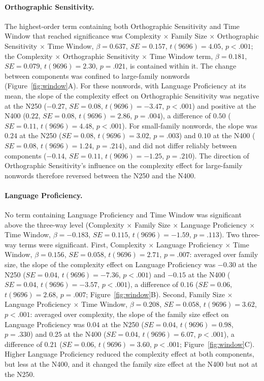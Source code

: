 \paragraph*{Orthographic Sensitivity.} The highest-order term containing both Orthographic Sensitivity and Time Window that reached significance was Complexity $\times$ Family Size $\times$ Orthographic Sensitivity $\times$ Time Window, $\beta = 0.637$, $SE = 0.157$, $t(9696) = 4.05$, $p < .001$; the Complexity $\times$ Orthographic Sensitivity $\times$ Time Window term, $\beta = 0.181$, $SE = 0.079$, $t(9696) = 2.30$, $p = .021$, is contained within it. The change between components was confined to large-family nonwords (Figure~\ref{fig:window}A). For these nonwords, with Language Proficiency at its mean, the slope of the complexity effect on Orthographic Sensitivity was negative at the N250 ($-0.27$, $SE = 0.08$, $t(9696) = -3.47$, $p < .001$) and positive at the N400 ($0.22$, $SE = 0.08$, $t(9696) = 2.86$, $p = .004$), a difference of $0.50$ ($SE = 0.11$, $t(9696) = 4.48$, $p < .001$). For small-family nonwords, the slope was $0.24$ at the N250 ($SE = 0.08$, $t(9696) = 3.02$, $p = .003$) and $0.10$ at the N400 ($SE = 0.08$, $t(9696) = 1.24$, $p = .214$), and did not differ reliably between components ($-0.14$, $SE = 0.11$, $t(9696) = -1.25$, $p = .210$). The direction of Orthographic Sensitivity's influence on the complexity effect for large-family nonwords therefore reversed between the N250 and the N400.

\paragraph*{Language Proficiency.} No term containing Language Proficiency and Time Window was significant above the three-way level (Complexity $\times$ Family Size $\times$ Language Proficiency $\times$ Time Window, $\beta = -0.183$, $SE = 0.115$, $t(9696) = -1.59$, $p = .113$). Two three-way terms were significant. First, Complexity $\times$ Language Proficiency $\times$ Time Window, $\beta = 0.156$, $SE = 0.058$, $t(9696) = 2.71$, $p = .007$: averaged over family size, the slope of the complexity effect on Language Proficiency was $-0.30$ at the N250 ($SE = 0.04$, $t(9696) = -7.36$, $p < .001$) and $-0.15$ at the N400 ($SE = 0.04$, $t(9696) = -3.57$, $p < .001$), a difference of $0.16$ ($SE = 0.06$, $t(9696) = 2.68$, $p = .007$; Figure~\ref{fig:window}B). Second, Family Size $\times$ Language Proficiency $\times$ Time Window, $\beta = 0.208$, $SE = 0.058$, $t(9696) = 3.62$, $p < .001$: averaged over complexity, the slope of the family size effect on Language Proficiency was $0.04$ at the N250 ($SE = 0.04$, $t(9696) = 0.98$, $p = .330$) and $0.25$ at the N400 ($SE = 0.04$, $t(9696) = 6.07$, $p < .001$), a difference of $0.21$ ($SE = 0.06$, $t(9696) = 3.60$, $p < .001$; Figure~\ref{fig:window}C). Higher Language Proficiency reduced the complexity effect at both components, but less at the N400, and it changed the family size effect at the N400 but not at the N250.

